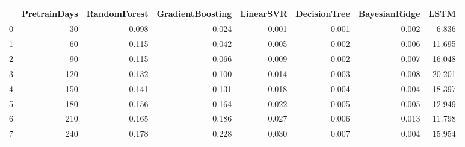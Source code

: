\begin{tabular}{lrrrrrrr}
\toprule
{} &  PretrainDays &  RandomForest &  GradientBoosting &  LinearSVR &  DecisionTree &  BayesianRidge &   LSTM \\
\midrule
0 &            30 &         0.098 &             0.024 &      0.001 &         0.001 &          0.002 &  6.836 \\
1 &            60 &         0.115 &             0.042 &      0.005 &         0.002 &          0.006 & 11.695 \\
2 &            90 &         0.115 &             0.066 &      0.009 &         0.002 &          0.007 & 16.048 \\
3 &           120 &         0.132 &             0.100 &      0.014 &         0.003 &          0.008 & 20.201 \\
4 &           150 &         0.141 &             0.131 &      0.018 &         0.004 &          0.004 & 18.397 \\
5 &           180 &         0.156 &             0.164 &      0.022 &         0.005 &          0.005 & 12.949 \\
6 &           210 &         0.165 &             0.186 &      0.027 &         0.006 &          0.013 & 11.798 \\
7 &           240 &         0.178 &             0.228 &      0.030 &         0.007 &          0.004 & 15.954 \\
\bottomrule
\end{tabular}
